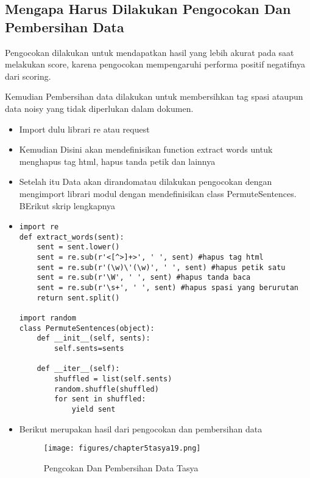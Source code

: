 \subsection{Mengapa Harus Dilakukan Pengocokan Dan Pembersihan Data}
Pengocokan dilakukan untuk mendapatkan hasil yang lebih akurat pada saat melakukan score, karena pengocokan mempengaruhi performa positif negatifnya dari scoring.

Kemudian Pembersihan data dilakukan untuk membersihkan tag spasi ataupun data noisy yang tidak diperlukan dalam dokumen.
\begin{itemize}
\item Import dulu librari re atau request
\item Kemudian Disini akan mendefinisikan function extract words untuk menghapus tag html, hapus tanda petik dan lainnya
\item Setelah itu Data akan dirandomatau dilakukan pengocokan dengan mengimport librari modul dengan mendefinisikan class PermuteSentences. BErikut skrip lengkapnya
\item \begin{verbatim}
import re
def extract_words(sent):
    sent = sent.lower()
    sent = re.sub(r'<[^>]+>', ' ', sent) #hapus tag html
    sent = re.sub(r'(\w)\'(\w)', ' ', sent) #hapus petik satu
    sent = re.sub(r'\W', ' ', sent) #hapus tanda baca
    sent = re.sub(r'\s+', ' ', sent) #hapus spasi yang berurutan
    return sent.split()

import random
class PermuteSentences(object):
    def __init__(self, sents):
        self.sents=sents
        
    def __iter__(self):
        shuffled = list(self.sents)
        random.shuffle(shuffled)
        for sent in shuffled:
            yield sent
\end{verbatim}
\item Berikut merupakan hasil dari pengocokan dan pembersihan data
\begin{figure}[ht]
\centering
\texttt{[image: figures/chapter5tasya19.png]}
\caption{Pengcokan Dan Pembersihan Data Tasya}
\label{Praktek}
\end{figure}
\end{itemize}

